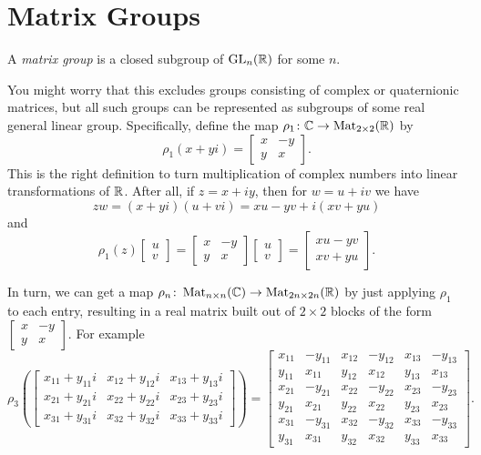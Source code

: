 \section{Matrix Groups} 
\label{sec:matrix groups}

\begin{definition}\label{def:matrix group}
	A \emph{matrix group} is a closed subgroup of $\operatorname{GL}_n(\mathbb{R})$ for some $n$.
\end{definition}

You might worry that this excludes groups consisting of complex or quaternionic matrices, but all such groups can be represented as subgroups of some real general linear group. Specifically, define the map $\rho_1 \colon\thinspace\! \mathbb{C} \to \operatorname{Mat}_{2 \times 2} (\mathbb{R})$ by
\[
	\rho_1(x+yi) = \begin{bmatrix} x & -y \\ y & x \end{bmatrix}.
\]
This is the right definition to turn multiplication of complex numbers into linear transformations of $\mathbb{R}$. After all, if $z= x+iy$, then for $w = u + i v$ we have
\[
	zw = (x+yi)(u+vi) = xu-yv + i(xv+yu)
\]
and
\[
	\rho_1(z)\begin{bmatrix} u \\ v \end{bmatrix} = \begin{bmatrix} x & -y \\ y & x \end{bmatrix}\begin{bmatrix} u \\ v \end{bmatrix} = \begin{bmatrix} xu-yv \\ xv+yu \end{bmatrix}.
\]

In turn, we can get a map $\rho_n \colon\thinspace\! \operatorname{Mat}_{n \times n}(\mathbb{C}) \to \operatorname{Mat}_{2n \times 2n}(\mathbb{R})$ by just applying $\rho_1$ to each entry, resulting in a real matrix built out of $2 \times 2$ blocks of the form $\begin{bmatrix} x & -y \\ y & x \end{bmatrix}$. For example
\[
   	\rho_3\left(\begin{bmatrix} x_{11}+ y_{11}i & x_{12}+ y_{12}i & x_{13}+ y_{13}i \\
    x_{21}+ y_{21}i & x_{22}+ y_{22}i & x_{23}+ y_{23}i \\
    x_{31}+ y_{31}i & x_{32}+ y_{32}i & x_{33}+ y_{33}i \end{bmatrix}\right) = \begin{bmatrix} x_{11} & -y_{11} & x_{12} & -y_{12} & x_{13} & -y_{13} \\
    y_{11} & x_{11} & y_{12} & x_{12} & y_{13} & x_{13} \\
    x_{21} & -y_{21} & x_{22} & -y_{22} & x_{23} & -y_{23} \\
    y_{21} & x_{21} & y_{22} & x_{22} & y_{23} & x_{23} \\
    x_{31} & -y_{31} & x_{32} & -y_{32} & x_{33} & -y_{33} \\
    y_{31} & x_{31} & y_{32} & x_{32} & y_{33} & x_{33} \end{bmatrix}.
\]

